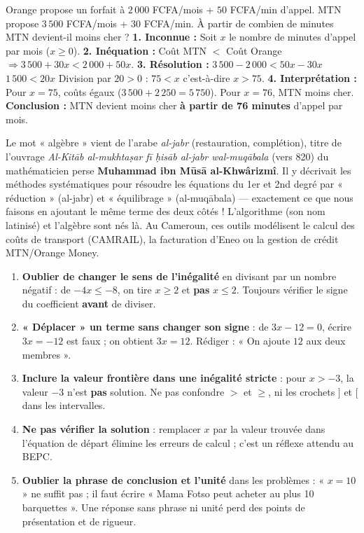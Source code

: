 \documentclass[11pt]{article}
\begin{document}
\begin{exoresolu}
Orange propose un forfait à $2\,000$ FCFA/mois + $50$ FCFA/min d'appel. MTN propose $3\,500$ FCFA/mois + $30$ FCFA/min. À partir de combien de minutes MTN devient-il moins cher ?
\tcblower
\textbf{1. Inconnue :} Soit $x$ le nombre de minutes d'appel par mois ($x \geq 0$).
\textbf{2. Inéquation :} Coût MTN $<$ Coût Orange $\Rightarrow 3\,500 + 30x < 2\,000 + 50x$.
\textbf{3. Résolution :}
$3\,500 - 2\,000 < 50x - 30x$
$1\,500 < 20x$
Division par $20>0$ : $75 < x$ c'est-à-dire $x > 75$.
\textbf{4. Interprétation :} Pour $x=75$, coûts égaux ($3\,500+2\,250=5\,750$). Pour $x=76$, MTN moins cher.
\textbf{Conclusion :} MTN devient moins cher \textbf{à partir de 76 minutes} d'appel par mois.
\end{exoresolu}

\begin{savaistu}
Le mot « algèbre » vient de l'arabe \emph{al-jabr} (restauration, complétion), titre de l'ouvrage \emph{Al-Kitāb al-mukhtaṣar fī ḥisāb al-jabr wal-muqābala} (vers 820) du mathématicien perse \textbf{Muhammad ibn Mūsā al-Khwârizmî}. Il y décrivait les méthodes systématiques pour résoudre les équations du 1er et 2nd degré par « réduction » (al-jabr) et « équilibrage » (al-muqābala) — exactement ce que nous faisons en ajoutant le même terme des deux côtés ! L'algorithme (son nom latinisé) et l'algèbre sont nés là. Au Cameroun, ces outils modélisent le calcul des coûts de transport (CAMRAIL), la facturation d'Eneo ou la gestion de crédit MTN/Orange Money.
\end{savaistu}

\begin{attention}
\begin{enumerate}
\item \textbf{Oublier de changer le sens de l'inégalité} en divisant par un nombre négatif : de $-4x\leq -8$, on tire $x\geq 2$ et \textbf{pas} $x\leq 2$. Toujours vérifier le signe du coefficient \textbf{avant} de diviser.
\item \textbf{« Déplacer » un terme sans changer son signe} : de $3x-12=0$, écrire $3x=-12$ est faux ; on obtient $3x=12$. Rédiger : « On ajoute $12$ aux deux membres ».
\item \textbf{Inclure la valeur frontière dans une inégalité stricte} : pour $x>-3$, la valeur $-3$ n'est \textbf{pas} solution. Ne pas confondre $>$ et $\geq$, ni les crochets $]$ et $[$ dans les intervalles.
\item \textbf{Ne pas vérifier la solution} : remplacer $x$ par la valeur trouvée dans l'équation de départ élimine les erreurs de calcul ; c'est un réflexe attendu au BEPC.
\item \textbf{Oublier la phrase de conclusion et l'unité} dans les problèmes : « $x=10$ » ne suffit pas ; il faut écrire « Mama Fotso peut acheter au plus 10 barquettes ». Une réponse sans phrase ni unité perd des points de présentation et de rigueur.
\end{enumerate}
\end{attention}
\end{document}

